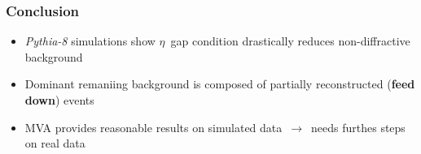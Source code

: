 \documentclass{beamer}
\begin{document}

{
\begin{frame}
    \frametitle{Conclusion}
    \begin{itemize}
        \item \emph{Pythia-8} simulations show $\eta$~gap condition drastically reduces non-diffractive background 
        \item Dominant remaniing background is composed of partially reconstructed (\textbf{feed down}) events
        \item MVA provides reasonable results on simulated data~$\to$~needs furthes steps on real data
    \end{itemize}
\end{frame}
}

\end{document}

